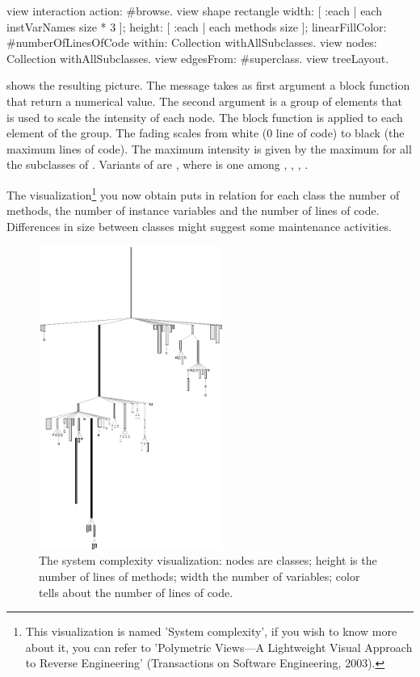 \documentclass[a4paper,10pt,twoside]{book}
\begin{document}
\begin{code}{}
view interaction action: #browse.
view shape rectangle
	width: [ :each | each instVarNames size * 3 ];
	height: [ :each | each methods size ];
	linearFillColor: #numberOfLinesOfCode within: Collection withAllSubclasses.
view nodes: Collection withAllSubclasses.
view edgesFrom: #superclass.
view treeLayout.
\end{code}

 shows the resulting picture. The message  takes as first argument a block function that return a numerical value. The second argument is a group of elements that is used to scale the intensity of each node. The block function is applied to each element of the group. The fading scales from white (0 line of code) to black (the maximum lines of code). The maximum intensity is given by the maximum  for all the subclasses of . 
Variants of  are , where  is one among , , , .

The visualization\footnote{This visualization is named 'System complexity', if you wish to know more about it, you can refer to 'Polymetric Views---A Lightweight Visual Approach to Reverse Engineering' (Transactions on Software Engineering, 2003).} you now obtain puts in relation for each class the number of methods, the number of instance variables and the number of lines of code. Differences in size between classes might suggest some maintenance activities. 



\begin{figure}[htbp]
\centerline{\includegraphics[width=6cm]{systemComplexity}}
\caption{The system complexity visualization: nodes are classes; height is the number of lines of methods; width the number of variables; color tells about the number of lines of code.}
\label{fig:systemComplexity}
\end{figure}
\end{document}
